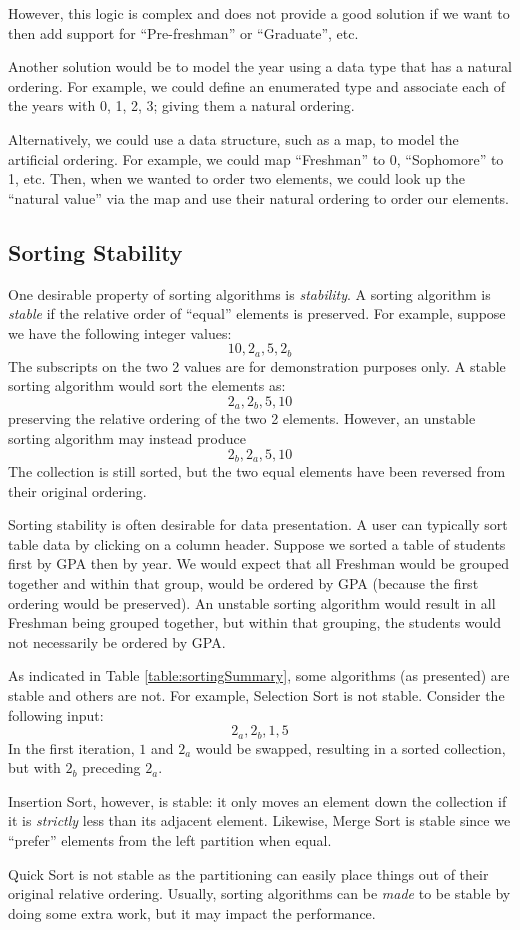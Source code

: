 However, this logic is complex and does not provide a good solution if
we want to then add support for ``Pre-freshman'' or ``Graduate'', etc.

Another solution would be to model the year using a data type that has a 
natural ordering.  For example, we could define an enumerated type
and associate each of the years with 0, 1, 2, 3; giving them a
natural ordering.

Alternatively, we could use a data structure, such as a map, to model
the artificial ordering.  For example, we could map ``Freshman'' to 0, 
``Sophomore'' to 1, etc. Then, when we wanted to order two elements, we
could look up the ``natural value'' via the map and use their natural
ordering to order our elements.


\subsection{Sorting Stability}
\label{subsection:sortingStability}

One desirable property of sorting algorithms is \emph{stability}.  A
sorting algorithm is \emph{stable} if the relative order of ``equal'' 
elements is preserved.  For example, suppose we have the following
integer values:
  $$10, 2_a, 5, 2_b$$
The subscripts on the two 2 values are for demonstration purposes only.
A stable sorting algorithm would sort the elements as:
  $$2_a, 2_b, 5, 10$$
preserving the relative ordering of the two 2 elements.  However, an
unstable sorting algorithm may instead produce
  $$2_b, 2_a, 5, 10$$
The collection is still sorted, but the two equal elements have been 
reversed from their original ordering.

Sorting stability is often desirable for data presentation.  A user
can typically sort table data by clicking on a column header.  Suppose
we sorted a table of students first by GPA then by year.  We would expect
that all Freshman would be grouped together and within that group, would
be ordered by GPA (because the first ordering would be preserved).  An
unstable sorting algorithm would result in all Freshman being grouped together, but within that grouping, the students would not necessarily be ordered 
by GPA.

As indicated in Table \ref{table:sortingSummary}, some algorithms (as presented)
are stable and others are not.  For example, Selection Sort is not stable.  
Consider the following input:
 $$2_a, 2_b, 1, 5$$
In the first iteration, $1$ and $2_a$ would be swapped, resulting in a
sorted collection, but with $2_b$ preceding $2_a$.

Insertion Sort, however, is stable: it only moves an element down the
collection if it is \emph{strictly} less than its adjacent element.  Likewise,
Merge Sort is stable since we ``prefer'' elements from the left partition
when equal.

Quick Sort is not stable as the partitioning can easily place things out of
their original relative ordering.  Usually, sorting algorithms can be 
\emph{made} to be stable by doing some extra work, but it may impact the
performance.


